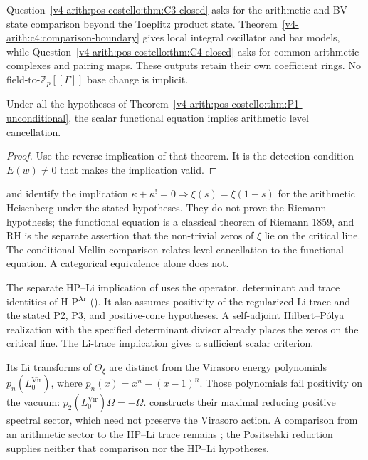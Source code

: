 Question~\ref{v4-arith:pos-costello:thm:C3-closed} asks for the
arithmetic and BV state comparison beyond the Toeplitz product state.
Theorem~\ref{v4-arith:c4:comparison-boundary} gives local integral
oscillator and bar models, while
Question~\ref{v4-arith:pos-costello:thm:C4-closed} asks for common
arithmetic complexes and pairing maps. These outputs retain their
own coefficient rings. No field-to-\(\mathbb Z_p[[\Gamma]]\) base
change is implicit.

\begin{corollary}
\label{v4-arith:pos-costello:cor:arith-Heis-Koszul}
Under all the hypotheses of
Theorem~\ref{v4-arith:pos-costello:thm:P1-unconditional}, the scalar
functional equation implies arithmetic level cancellation.
\end{corollary}
\begin{proof}
Use the reverse implication of that theorem. It is the detection
condition \(E(w)\ne0\) that makes the implication valid.
\end{proof}

\begin{remark}
\label{v4-arith:pos-costello:rem:not-RH}
 and
 identify the
implication \(\kappa+\kappa^{!}=0\Rightarrow\xi(s)=\xi(1-s)\) for
the arithmetic Heisenberg under the stated hypotheses. They do not prove the Riemann
hypothesis; the functional equation is a classical theorem of
Riemann 1859, and RH is the separate assertion that the
non-trivial zeros of \(\xi\) lie on the critical line. The
conditional Mellin comparison relates level cancellation to the
functional equation. A categorical equivalence alone does not.

The separate HP--Li implication of
 uses the operator, determinant
and trace identities of H-P\({}^{\mathrm{Ar}}\)
(). It also assumes positivity of the
regularized Li trace and the stated P2, P3, and positive-cone hypotheses. A self-adjoint Hilbert--P\'{o}lya realization with the
specified determinant divisor already places the zeros on the critical
line. The Li-trace implication gives a sufficient scalar criterion.

Its Li transforms of \(\Theta_\xi\) are distinct from the Virasoro
energy polynomials \(p_n(L_0^{\mathrm{Vir}})\), where
\(p_n(x)=x^n-(x-1)^n\).
Those polynomials fail positivity on the vacuum:
\(p_2(L_0^{\mathrm{Vir}})\Omega=-\Omega\).
 constructs their maximal reducing
positive spectral sector, which need not preserve the Virasoro action.
A comparison from an arithmetic sector to the HP--Li trace remains
; the Positselski reduction
supplies neither that comparison nor the HP--Li hypotheses.
\end{remark}

